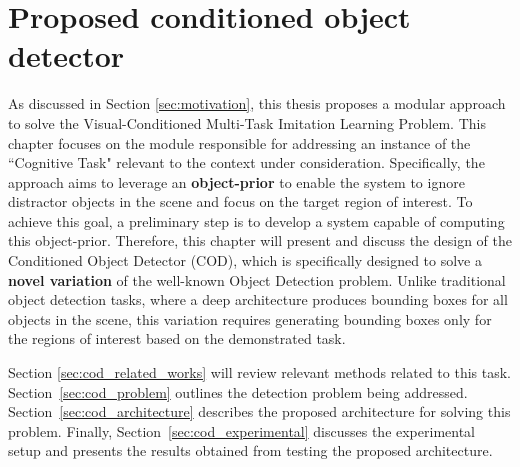 \chapter{Proposed conditioned object detector}
\label{ch:cod}
As discussed in Section \ref{sec:motivation}, this thesis proposes a modular approach to solve the Visual-Conditioned Multi-Task Imitation Learning Problem. This chapter focuses on the module responsible for addressing an instance of the ``Cognitive Task" relevant to the context under consideration. Specifically, the approach aims to leverage an \textbf{object-prior} to enable the system to ignore distractor objects in the scene and focus on the target region of interest. To achieve this goal, a preliminary step is to develop a system capable of computing this object-prior. Therefore, this chapter will present and discuss the design of the Conditioned Object Detector (COD), which is specifically designed to solve a \textbf{novel variation} of the well-known Object Detection problem. Unlike traditional object detection tasks, where a deep architecture produces bounding boxes for all objects in the scene, this variation requires generating bounding boxes only for the regions of interest based on the demonstrated task.

Section \ref{sec:cod_related_works} will review relevant methods related to this task. 
Section~\ref{sec:cod_problem} outlines the detection problem being addressed. Section~\ref{sec:cod_architecture} describes the proposed architecture for solving this problem. Finally, Section~\ref{sec:cod_experimental} discusses the experimental setup and presents the results obtained from testing the proposed architecture.




